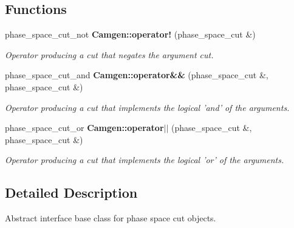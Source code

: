 \subsection*{Functions}
\begin{DoxyCompactItemize}
\item 
\hypertarget{a00849_a26acdc0b99758409ccded0a9f08eeca3}{phase\-\_\-space\-\_\-cut\-\_\-not {\bfseries Camgen\-::operator!} (phase\-\_\-space\-\_\-cut \&)}\label{a00849_a26acdc0b99758409ccded0a9f08eeca3}

\begin{DoxyCompactList}\small\item\em Operator producing a cut that negates the argument cut. \end{DoxyCompactList}\item 
\hypertarget{a00849_a664f304b8f6f43326223ef16057e1e1a}{phase\-\_\-space\-\_\-cut\-\_\-and {\bfseries Camgen\-::operator\&\&} (phase\-\_\-space\-\_\-cut \&, phase\-\_\-space\-\_\-cut \&)}\label{a00849_a664f304b8f6f43326223ef16057e1e1a}

\begin{DoxyCompactList}\small\item\em Operator producing a cut that implements the logical 'and' of the arguments. \end{DoxyCompactList}\item 
\hypertarget{a00849_a441355efea917b6bda0dad1f1b2a3449}{phase\-\_\-space\-\_\-cut\-\_\-or {\bfseries Camgen\-::operator$|$$|$} (phase\-\_\-space\-\_\-cut \&, phase\-\_\-space\-\_\-cut \&)}\label{a00849_a441355efea917b6bda0dad1f1b2a3449}

\begin{DoxyCompactList}\small\item\em Operator producing a cut that implements the logical 'or' of the arguments. \end{DoxyCompactList}\end{DoxyCompactItemize}


\subsection{Detailed Description}
Abstract interface base class for phase space cut objects. 
